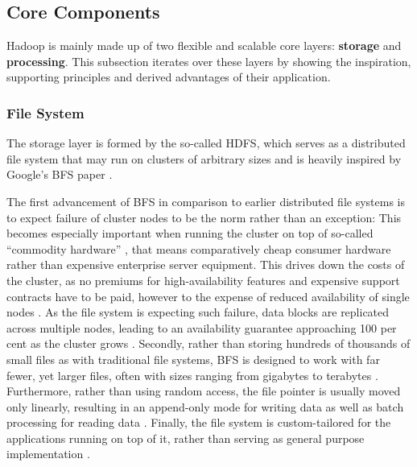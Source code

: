 \subsection{Core Components}
\label{hadoop-components}

Hadoop is mainly made up of two flexible and scalable core layers: \textbf{storage} and \textbf{processing}. This subsection iterates over these layers by showing the inspiration, supporting principles and derived advantages of their application.

\subsubsection{File System} 
The storage layer is formed by the so-called \acf{HDFS}, which serves as a distributed file system that may run on clusters of arbitrary sizes and is heavily inspired by Google's \ac{BFS} paper \autocite{ghemawat2003gfs}.

The first advancement of \ac{BFS} in comparison to earlier distributed file systems is to expect failure of cluster nodes to be the norm rather than an exception: This becomes especially important when running the cluster on top of so-called \enquote{commodity hardware} \autocite[p.~1]{ghemawat2003gfs}, that means comparatively cheap consumer hardware rather than expensive enterprise server equipment. This drives down the costs of the cluster, as no premiums for high-availability features and expensive support contracts have to be paid, however to the expense of reduced availability of single nodes \autocite[p.~1]{ghemawat2003gfs}. As the file system is expecting such failure, data blocks are replicated across multiple nodes, leading to an availability guarantee approaching 100 per cent as the cluster grows \autocite[p.~2]{ghemawat2003gfs}. Secondly, rather than storing hundreds of thousands of small files as with traditional file systems, \ac{BFS} is designed to work with far fewer, yet larger files, often with sizes ranging from gigabytes to terabytes \autocite[p.~2]{ghemawat2003gfs}. Furthermore, rather than using random access, the file pointer is usually moved only linearly, resulting in an append-only mode for writing data as well as batch processing for reading data \autocite[p.~2]{ghemawat2003gfs}. Finally, the file system is custom-tailored for the applications running on top of it, rather than serving as general purpose implementation \autocite[p.~2]{ghemawat2003gfs}.


